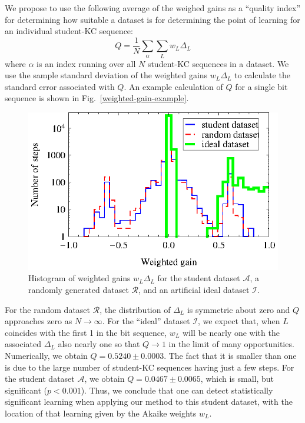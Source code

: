 \documentclass{edm_template}
\begin{document}
We propose to use the following average of the weighed gains as
a ``quality index'' for determining how suitable a 
dataset is for determining the point of learning for an individual
student-KC sequence:
%
\begin{equation}
           Q= \frac{1}{N} \sum_\alpha \sum_L w_L \Delta_L
\end{equation}
%
where $\alpha$ is an index running over all $N$ student-KC sequences in a 
dataset.
We use the sample standard deviation of the weighted gains $w_L \Delta_L$
to calculate the standard error associated with $Q$. 
An example calculation of $Q$ for a single bit sequence is shown in Fig.~\ref{weighted-gain-example}.

\begin{figure}
  \centering \includegraphics{weighted-gain-histogram2.eps}
   \caption{Histogram of weighted gains $w_L \Delta_L$ for
     the student dataset $\mathcal{A}$, 
     a randomly generated dataset $\mathcal{R}$,
     and an artificial ideal dataset $\mathcal{I}$.}
    \label{weighted-gain-histogram2}
\end{figure}

For the random dataset $\mathcal{R}$, the distribution of $\Delta_L$
is symmetric about zero and $Q$ approaches zero as $N \to \infty$.
For the ``ideal'' dataset $\mathcal{I}$, we expect that, when
$L$ coincides with the first 1 in
the bit sequence, $w_L$ will be nearly one with the associated $\Delta_L$
also nearly one so that $Q\to 1$ in the limit of many opportunities.
Numerically, we obtain $Q=0.5240\pm0.0003$.  The fact that it is
smaller than one is due to the large number of student-KC sequences having
just a few steps.  For the student dataset $\mathcal{A}$, we obtain
$Q=0.0467\pm0.0065$, which is small, but significant
($p<0.001$). Thus, we conclude that one can detect statistically
significant learning when applying our method to this student dataset,
with the location of that learning given by the Akaike weights $w_L$.
\end{document}
